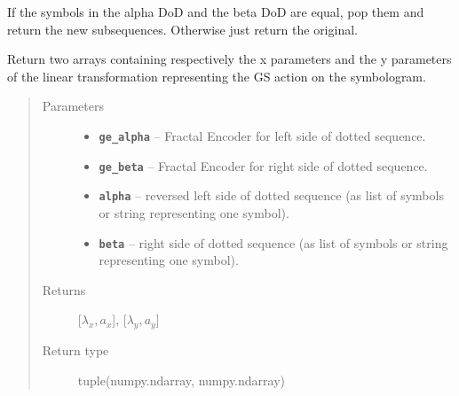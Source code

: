 \documentclass[letterpaper,10pt,english]{sphinxmanual}
\begin{document}
\begin{fulllineitems}
\begin{fulllineitems}
\end{fulllineitems}


\begin{fulllineitems}
\label{symdyn_docs:symdyn.SimpleCFGeneralizedShift.attach}
If the symbols in the alpha DoD and the beta DoD are equal, pop
them and return the new subsequences. Otherwise just return
the original.

\end{fulllineitems}


\begin{fulllineitems}
\label{symdyn_docs:symdyn.SimpleCFGeneralizedShift.lintransf_params}
Return two arrays containing respectively the x parameters and the
y parameters of the linear transformation representing the GS
action on the symbologram.
\begin{quote}\begin{description}
\item[{Parameters}] \leavevmode\begin{itemize}
\item {} 
\textbf{\texttt{ge\_alpha}} -- Fractal Encoder for left side of dotted
sequence.

\item {} 
\textbf{\texttt{ge\_beta}} -- Fractal Encoder for right side of dotted
sequence.

\item {} 
\textbf{\texttt{alpha}} -- reversed left side of dotted sequence (as list
of symbols or string representing one symbol).

\item {} 
\textbf{\texttt{beta}} -- right side of dotted sequence (as list of symbols
or string representing one symbol).

\end{itemize}

\item[{Returns}] \leavevmode
{[}\(\lambda_x, a_x\){]}, {[}\(\lambda_y, a_y\){]}

\item[{Return type}] \leavevmode
tuple(numpy.ndarray, numpy.ndarray)

\end{description}\end{quote}

\end{fulllineitems}


\end{fulllineitems}
\end{document}
